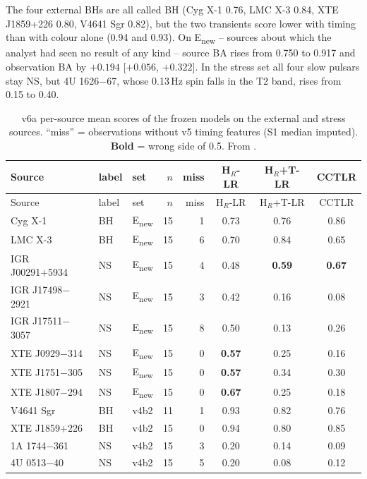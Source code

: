 The four external BHs are all called BH (Cyg X-1 0.76, LMC X-3 0.84, XTE J1859+226 0.80, V4641 Sgr 0.82), but the two
transients score lower with timing than with colour alone (0.94 and 0.93). On E\textsubscript{new} -- sources about which
the analyst had seen no result of any kind -- source BA rises from 0.750 to 0.917 and observation BA by $+0.194$
[$+0.056$, $+0.322$]. In the stress set all four slow pulsars stay NS, but 4U 1626$-$67, whose 0.13\,Hz spin falls in the
T2 band, rises from 0.15 to 0.40.

{\footnotesize\setlength{\tabcolsep}{3.5pt}
\begin{longtable}{@{}lllrrccc@{}}
\caption[v6a per-source scores]{v6a per-source mean scores of the frozen models on the external and stress sources.
``miss'' = observations without v5 timing features (S1 median imputed). \textbf{Bold} = wrong side of 0.5. From
.}\label{tab:p3v6persource}\\
\toprule
Source & label & set & $n$ & miss & H$_R$-LR & H$_R$+T-LR & CCTLR \\
\midrule\endfirsthead
\toprule Source & label & set & $n$ & miss & H$_R$-LR & H$_R$+T-LR & CCTLR \\ \midrule\endhead
\bottomrule\endfoot
Cyg X-1 & BH & E\textsubscript{new} & 15 & 1 & 0.73 & 0.76 & 0.86 \\
LMC X-3 & BH & E\textsubscript{new} & 15 & 6 & 0.70 & 0.84 & 0.65 \\
IGR J00291+5934 & NS & E\textsubscript{new} & 15 & 4 & 0.48 & \textbf{0.59} & \textbf{0.67} \\
IGR J17498$-$2921 & NS & E\textsubscript{new} & 15 & 3 & 0.42 & 0.16 & 0.08 \\
IGR J17511$-$3057 & NS & E\textsubscript{new} & 15 & 8 & 0.50 & 0.13 & 0.26 \\
XTE J0929$-$314 & NS & E\textsubscript{new} & 15 & 0 & \textbf{0.57} & 0.25 & 0.16 \\
XTE J1751$-$305 & NS & E\textsubscript{new} & 15 & 0 & \textbf{0.57} & 0.34 & 0.30 \\
XTE J1807$-$294 & NS & E\textsubscript{new} & 15 & 0 & \textbf{0.67} & 0.25 & 0.18 \\
V4641 Sgr & BH & v4b2 & 11 & 1 & 0.93 & 0.82 & 0.76 \\
XTE J1859+226 & BH & v4b2 & 15 & 0 & 0.94 & 0.80 & 0.85 \\
1A 1744$-$361 & NS & v4b2 & 15 & 3 & 0.20 & 0.14 & 0.09 \\
4U 0513$-$40 & NS & v4b2 & 15 & 5 & 0.20 & 0.08 & 0.12 \\

\end{longtable}}
